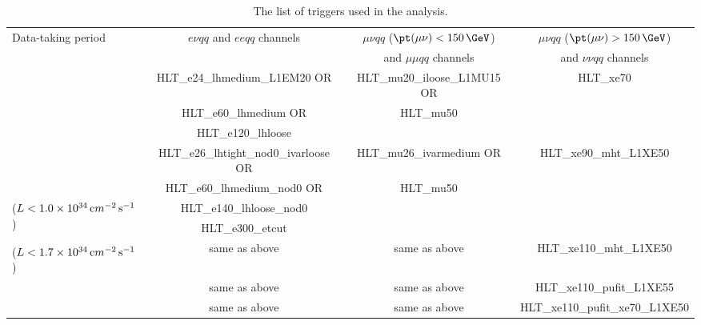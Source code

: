 \begin{landscape}
\begin{table}[p]
  \caption{The list of triggers used in the analysis.} \label{tab:triggers}
\begin{center} 
\small
\begin{tabular}{|l|c|c|c|}
\hline
\multirow{2}{*}{Data-taking period} & \multirow{2}{*}{$e\nu qq$ and $eeqq$ channels} & $\mu\nu qq$ ($\pt(\mu\nu)<150\,\GeV$) & $\mu\nu qq$ ($\pt(\mu\nu) > 150\,\GeV$)  \\
&& and $\mu\mu qq$ channels& and $\nu\nu qq$ channels\\
\hline
\hline
\multirow{3}{*}{\centering {2015}} & HLT\_e24\_lhmedium\_L1EM20 OR & HLT\_mu20\_iloose\_L1MU15 OR & \multirow{3}{*}{ HLT\_xe70 } \\
 & HLT\_e60\_lhmedium OR & HLT\_mu50 & \\
 & HLT\_e120\_lhloose & & \\
\hline
\multirow{2}{*}{\centering {2016a (run $< 302919$)}} & HLT\_e26\_lhtight\_nod0\_ivarloose OR & HLT\_mu26\_ivarmedium OR  & \multirow{3}{*}{ HLT\_xe90\_mht\_L1XE50 } \\
 & HLT\_e60\_lhmedium\_nod0 OR & HLT\_mu50 &  \\ 
\multirow{2}{*}{($L<1.0\times10^{34}\,{\textrm cm}^{-2}\,{\textrm s}^{-1}$)} & HLT\_e140\_lhloose\_nod0 & & \\
 & HLT\_e300\_etcut & & \\
\hline
{\centering {2016b (run $\geq 302919$)}} & \multirow{2}{*}{same as above} & \multirow{2}{*}{same as above}  &  \multirow{2}{*}{HLT\_xe110\_mht\_L1XE50} \\
($L<1.7\times10^{34}\,{\textrm cm}^{-2}\,{\textrm s}^{-1}$) & & &\\
\hline
{\centering {2017}} & same as above & same as above  &  HLT\_xe110\_pufit\_L1XE55 \\
\hline
{\centering {2018}} & same as above & same as above  &  HLT\_xe110\_pufit\_xe70\_L1XE50  \\
\hline
\end{tabular}
\end{center}
\end{table}
\end{landscape}


